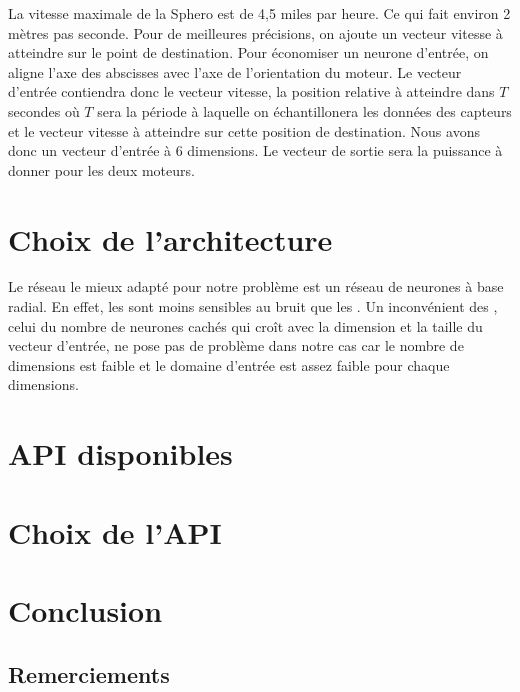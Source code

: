 \documentclass[12pt,a4paper,oneside, titlepage]{article}
\begin{document}

La vitesse maximale de la Sphero est de 4,5 miles par heure\cite{product}.
Ce qui fait environ 2 mètres pas seconde.
Pour de meilleures précisions, on ajoute un vecteur vitesse à atteindre sur le point de destination.
Pour économiser un neurone d'entrée, on aligne l'axe des abscisses avec l'axe de l'orientation du moteur.
Le vecteur d'entrée contiendra donc le vecteur vitesse, la position relative à atteindre dans $T$ secondes où $T$ sera la période à laquelle on échantillonera les données des capteurs et le vecteur vitesse à atteindre sur cette position de destination.
Nous avons donc un vecteur d'entrée à 6 dimensions.
Le vecteur de sortie sera la puissance à donner pour les deux moteurs.

\section{Choix de l'architecture}
Le réseau le mieux adapté pour notre problème est un réseau de neurones à base radial.
En effet, les \rbf sont moins sensibles au bruit que les \mlp \cite{adversarial,Gauthier}.%
Un inconvénient des \rbf, celui du nombre de neurones cachés qui croît avec la dimension et la taille du vecteur d'entrée, ne pose pas de problème dans notre cas
car le nombre de dimensions est faible
et le domaine d'entrée est assez faible pour chaque dimensions.
\section{API disponibles}
\section{Choix de l'API}
\section{Conclusion}
\subsection*{Remerciements}


\end{document}
